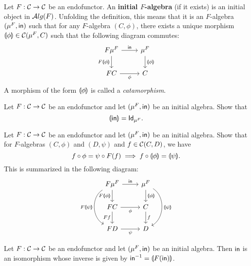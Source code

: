 \begin{dfn}\label{dfn:initial-alg}
  Let $F:\CC\to\CC$ be an endofunctor. An \textbf{initial $F$-algebra} (if it exists) is an initial object in $\ALG{F}$.
  Unfolding the definition, this means that it is an $F$-algebra $(\Initalg{F}, \In)$ such that for any $F$-algebra $(C,\phi)$, there exists a unique morphism $\catam{\phi} \in \CHom{\CC}{\Initalg{F}}{C}$ such that the following diagram commutes:
\begin{equation}\label{eq:initial-f-alg}
\begin{tikzcd}
{F\Initalg{F}} 
\arrow[r, "\In"] 
\arrow[d,swap, "F\catam{\phi}"]
& {\Initalg{F}} 
\arrow[d, "\catam{\phi}"] 
\\
FC
\arrow[r, swap, "\phi"] 
& C
\end{tikzcd}
\end{equation}
A morphism of the form $\catam{\phi}$ is called a \textit{catamorphism}.
\end{dfn}

\begin{exer}\label{exer:in_catamorphism_id}
  Let $F:\CC\to\CC$ be an endofunctor and let $(\Initalg F, \In)$ be an initial algebra. Show that
  \[\catam{\In} = \Id[\Initalg{F}].\]
\end{exer}

\begin{exer}\label{exer:fusion-property}
  Let $F:\CC\to\CC$ be an endofunctor and let $(\Initalg F, \In)$ be an initial algebra. Show that
  for $F$-algebras $(C,\phi)$ and $(D,\psi)$ and $f\in\CHom{\CC}{C}{D}$, we have 
\[
\co{\phi}{f} = \co{F(f)}{\psi} \implies \co{\catam{\phi}}{f} = \catam{\psi}.
\]
This is summarized in the following diagram:
\begin{equation}\label{eq:initial-f-alg-composition}
\begin{tikzcd}
F\Initalg{F} 
\arrow[r, "\In"] 
\arrow[d,swap, "F\catam{\phi}"]
\ar[dd, bend right=60, "F\catam{\psi}"']
&
\Initalg{F}
\arrow[d, "\catam{\phi}"]
\ar[dd, bend left=60, "\catam{\psi}"]
\\
FC
\arrow[r, swap, "\phi"]
\ar[d, "Ff"'] 
&
C \ar[d, "f"]
\\
FD \ar[r, "\psi"']
&
D
\end{tikzcd}
\end{equation}

\end{exer}

\begin{exer} Let $F:\CC\to\CC$ be an endofunctor and let $(\mu^F, \In)$ be an initial algebra.
  Then $\In$ is an isomorphism whose inverse is given by $\Inv{\In} = \catam{F(\In)}$.
\end{exer}

